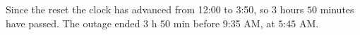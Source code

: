 Since the reset the clock has advanced from 12:00 to 3:50, so $3$ hours $50$ minutes have passed. The outage ended $3$ h $50$ min before 9:35 AM, at $\boxed{\text{5:45 AM}}$.
